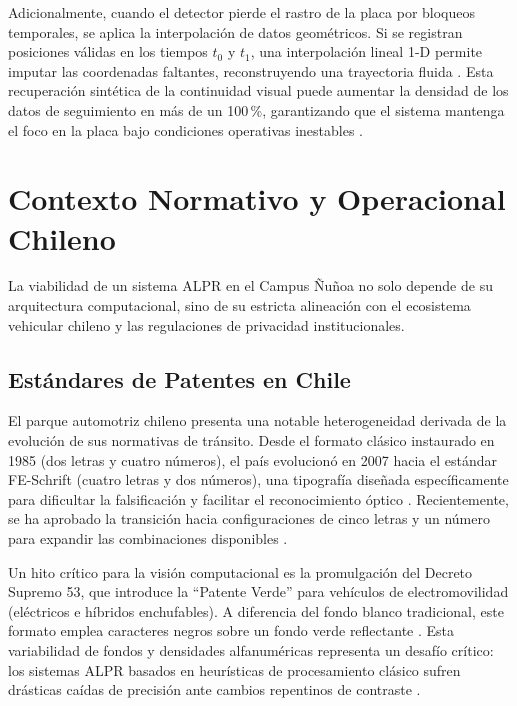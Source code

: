 Adicionalmente, cuando el detector pierde el rastro de la placa por bloqueos temporales, 
se aplica la interpolación de datos geométricos. Si se registran posiciones válidas en 
los tiempos $t_0$ y $t_1$, una interpolación lineal 1-D permite imputar las coordenadas 
faltantes, reconstruyendo una trayectoria fluida \parencite{mobeenRealTimeAutomaticLicense2026}. 
Esta recuperación sintética de la continuidad visual puede aumentar la densidad de los 
datos de seguimiento en más de un 100\,\%, garantizando que el sistema mantenga el foco 
en la placa bajo condiciones operativas inestables \parencite{mobeenRealTimeAutomaticLicense2026}.


\section{Contexto Normativo y Operacional Chileno}

La viabilidad de un sistema ALPR en el Campus Ñuñoa no solo depende de su arquitectura 
computacional, sino de su estricta alineación con el ecosistema vehicular chileno y 
las regulaciones de privacidad institucionales.

\subsection{Estándares de Patentes en Chile}

El parque automotriz chileno presenta una notable heterogeneidad derivada de la 
evolución de sus normativas de tránsito. Desde el formato clásico instaurado en 1985 
(dos letras y cuatro números), el país evolucionó en 2007 hacia el estándar FE-Schrift 
(cuatro letras y dos números), una tipografía diseñada específicamente para dificultar 
la falsificación y facilitar el reconocimiento óptico \parencite{https://magnet.clComoSeranCuando}. 
Recientemente, se ha aprobado la transición hacia configuraciones de cinco letras y 
un número para expandir las combinaciones disponibles \parencite{https://magnet.clComoSeranCuando}.

Un hito crítico para la visión computacional es la promulgación del Decreto Supremo 53, 
que introduce la ``Patente Verde'' para vehículos de electromovilidad (eléctricos e 
híbridos enchufables). A diferencia del fondo blanco tradicional, este formato emplea 
caracteres negros sobre un fondo verde reflectante 
\parencite{https://magnet.clComoSeranCuando}. Esta variabilidad de fondos y densidades 
alfanuméricas representa un desafío crítico: los sistemas ALPR basados en heurísticas de 
procesamiento clásico sufren drásticas caídas de precisión ante cambios repentinos de 
contraste \parencite{xuDeepLearningAlgorithms2026c}.

